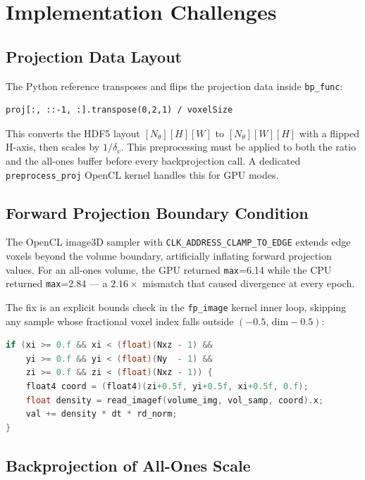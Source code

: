 \documentclass[11pt,a4paper]{article}
\begin{document}
\section{Implementation Challenges}
\label{sec:challenges}

\subsection{Projection Data Layout}

The Python reference transposes and flips the projection data inside \texttt{bp\_func}:
\begin{verbatim}
proj[:, ::-1, :].transpose(0,2,1) / voxelSize
\end{verbatim}
This converts the HDF5 layout $[N_\theta][H][W]$ to $[N_\theta][W][H]$ with a
flipped H-axis, then scales by $1/\delta_v$. This preprocessing must be applied to
both the ratio and the all-ones buffer before every backprojection call. A dedicated
\texttt{preprocess\_proj} OpenCL kernel handles this for GPU modes.

\subsection{Forward Projection Boundary Condition}

The OpenCL image3D sampler with \texttt{CLK\_ADDRESS\_CLAMP\_TO\_EDGE} extends
edge voxels beyond the volume boundary, artificially inflating forward projection
values. For an all-ones volume, the GPU returned \texttt{max}=6.14 while the CPU
returned \texttt{max}=2.84 --- a $2.16\times$ mismatch that caused divergence at
every epoch.

The fix is an explicit bounds check in the \texttt{fp\_image} kernel inner loop,
skipping any sample whose fractional voxel index falls outside
$(-0.5,\,\text{dim}-0.5)$:

\begin{lstlisting}[language=C]
if (xi >= 0.f && xi < (float)(Nxz - 1) &&
    yi >= 0.f && yi < (float)(Ny  - 1) &&
    zi >= 0.f && zi < (float)(Nxz - 1)) {
    float4 coord = (float4)(zi+0.5f, yi+0.5f, xi+0.5f, 0.f);
    float density = read_imagef(volume_img, vol_samp, coord).x;
    val += density * dt * rd_norm;
}
\end{lstlisting}

\subsection{Backprojection of All-Ones Scale}
\end{document}
